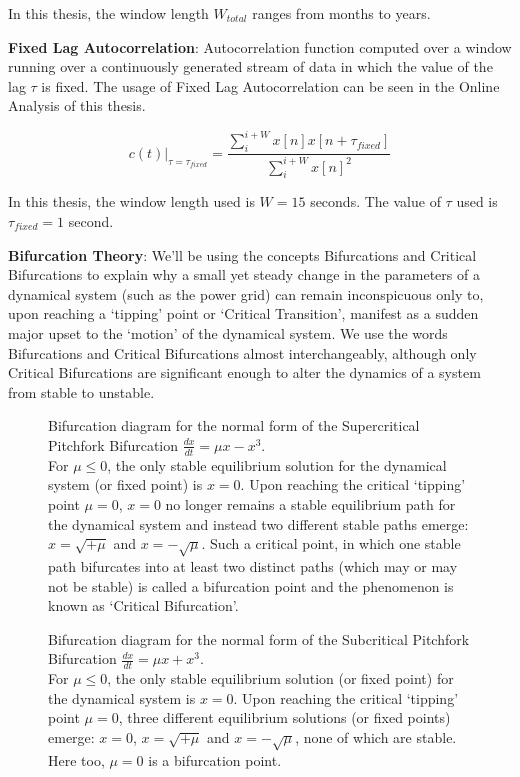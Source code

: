  In this thesis, the window length $W_{total}$ ranges from months to years.
 
 \textbf{Fixed Lag Autocorrelation}: Autocorrelation function computed over a window running over a continuously generated stream of data in which the value of the lag $\tau$ is fixed. The usage of Fixed Lag Autocorrelation can be seen in the Online Analysis of this thesis.
 
 \begin{equation}
 	c(t)|_{\tau = \tau_{fixed}} = \frac{\sum_{i}^{i+W} x[n]x[n+\tau_{fixed}]}{\sum_{i}^{i+W} x[n]^2} 
 \end{equation}
 
 In this thesis, the window length used is $W=15$ seconds. The value of $\tau$ used is $\tau_{fixed}=1$ second.

\textbf{Bifurcation Theory}: We'll be using the concepts Bifurcations and Critical Bifurcations to explain why a small yet steady change in the parameters of a dynamical system (such as the power grid) can remain inconspicuous only to, upon reaching a `tipping' point or `Critical Transition', manifest as a sudden major upset to the `motion' of the dynamical system. We use the words Bifurcations and Critical Bifurcations almost interchangeably, although only Critical Bifurcations are significant enough to alter the dynamics of a system from stable to unstable.


\begin{figure}[!ht]
	\caption{Bifurcation diagram for the normal form of the Supercritical Pitchfork Bifurcation $\frac{dx}{dt} = \mu x - x^3$. \\ For $\mu \leq 0$, the only stable equilibrium solution for the dynamical system (or fixed point) is $x=0$. Upon reaching the critical `tipping' point $\mu=0$, $x=0$ no longer remains a stable equilibrium path for the dynamical system and instead two different stable paths emerge: $x = \sqrt{+\mu}$ and $x = -\sqrt{\mu}$. Such a critical point, in which one stable path bifurcates into at least two distinct paths (which may or may not be stable) is called a bifurcation point and the phenomenon is known as `Critical Bifurcation'.}
\end{figure}

\begin{figure}[!ht]
	\caption{Bifurcation diagram for the normal form of the Subcritical Pitchfork Bifurcation $\frac{dx}{dt} = \mu x + x^3$. \\ For $\mu \leq 0$, the only stable equilibrium solution (or fixed point) for the dynamical system is $x=0$. Upon reaching the critical `tipping' point $\mu=0$, three different equilibrium solutions (or fixed points) emerge: $x=0$, $x = \sqrt{+\mu}$ and $x = -\sqrt{\mu}$, none of which are stable. Here too, $\mu=0$ is a bifurcation point.}
\end{figure}


